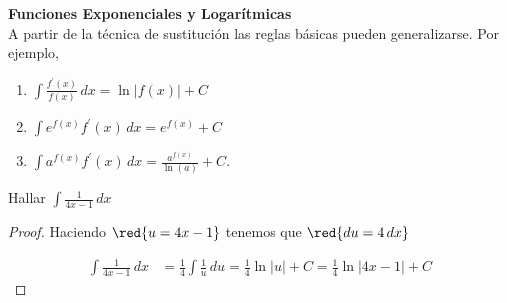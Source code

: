\textcolor{red!50!black}{\Large \bf Funciones Exponenciales y Logar\'itmicas}\\

\noindent A partir de la t\'ecnica de sustituci\'on las reglas b\'asicas pueden generalizarse. Por ejemplo,

\begin{table}[h]
\begin{tcolorbox}[boxrule=0.2pt, enhanced,sharp corners,   width=12cm,colframe=blue!8!black,colback=blue!5!white,drop lifted shadow=blue ]
\begin{multicols}{2}
\begin{enumerate}

  \item $\displaystyle \int \frac{f^{\prime}(x)}{f(x)} \,dx= \ln |f(x)|+C$
  \item $\displaystyle \int e^{f(x)}f^{\prime}(x)\,dx=e^{f(x)}+C$
  \columnbreak
  \item $\displaystyle \int a^{f(x)}f^{\prime}(x)\,dx=\frac{a^{f(x)}}{\ln(a)}+C.$
\end{enumerate}
\end{multicols}
\end{tcolorbox}
\end{table}



\begin{Ejemplo} Hallar $\displaystyle\int \frac{1}{4x-1} \,dx$ 
\end{Ejemplo}
\begin{proof}
Haciendo $\red{u=4x-1}$ tenemos que  $\red{du=4\,dx}$

 \begin{align*}
 \int \frac{1}{4x-1} \,dx & = \frac{1}{4} \int \frac{1}{u} \,du  = \frac{1}{4}
 \ln|u|+C  =\frac{1}{4}\ln|4x-1|+C
 \end{align*}
\end{proof}

